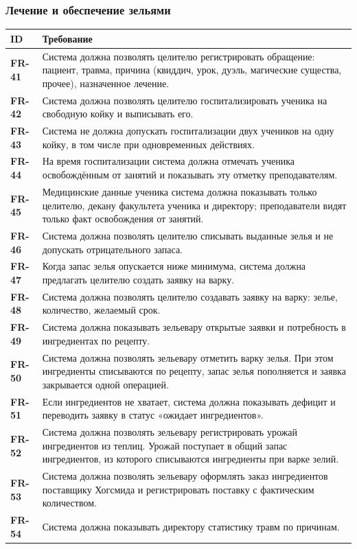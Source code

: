 \documentclass[a4paper,12pt]{article}
\newcommand{\req}[2]{\textbf{#1} & #2 \\ \hline}
\newenvironment{reqtable}{%
  \begin{longtable}{|>{\raggedright\arraybackslash}p{19mm}|>{\raggedright\arraybackslash}p{137mm}|}
  \hline
  \rowcolor{black!8}\textbf{ID} & \textbf{Требование} \\ \hline
  \endhead}{\end{longtable}}
\begin{document}
\subsubsection{Лечение и обеспечение зельями}
\begin{reqtable}
\req{FR-41}{Система должна позволять целителю регистрировать обращение: пациент, травма, причина (квиддич, урок, дуэль, магические существа, прочее), назначенное лечение.}
\req{FR-42}{Система должна позволять целителю госпитализировать ученика на свободную койку и выписывать его.}
\req{FR-43}{Система не должна допускать госпитализации двух учеников на одну койку, в том числе при одновременных действиях.}
\req{FR-44}{На время госпитализации система должна отмечать ученика освобождённым от занятий и показывать эту отметку преподавателям.}
\req{FR-45}{Медицинские данные ученика система должна показывать только целителю, декану факультета ученика и директору; преподаватели видят только факт освобождения от занятий.}
\req{FR-46}{Система должна позволять целителю списывать выданные зелья и не допускать отрицательного запаса.}
\req{FR-47}{Когда запас зелья опускается ниже минимума, система должна предлагать целителю создать заявку на варку.}
\req{FR-48}{Система должна позволять целителю создавать заявку на варку: зелье, количество, желаемый срок.}
\req{FR-49}{Система должна показывать зельевару открытые заявки и потребность в ингредиентах по рецепту.}
\req{FR-50}{Система должна позволять зельевару отметить варку зелья. При этом ингредиенты списываются по рецепту, запас зелья пополняется и заявка закрывается одной операцией.}
\req{FR-51}{Если ингредиентов не хватает, система должна показывать дефицит и переводить заявку в статус «ожидает ингредиентов».}
\req{FR-52}{Система должна позволять зельевару регистрировать урожай ингредиентов из теплиц. Урожай поступает в общий запас ингредиентов, из которого списываются ингредиенты при варке зелий.}
\req{FR-53}{Система должна позволять зельевару оформлять заказ ингредиентов поставщику Хогсмида и регистрировать поставку с фактическим количеством.}
\req{FR-54}{Система должна показывать директору статистику травм по причинам.}
\end{reqtable}
 
\end{document}
